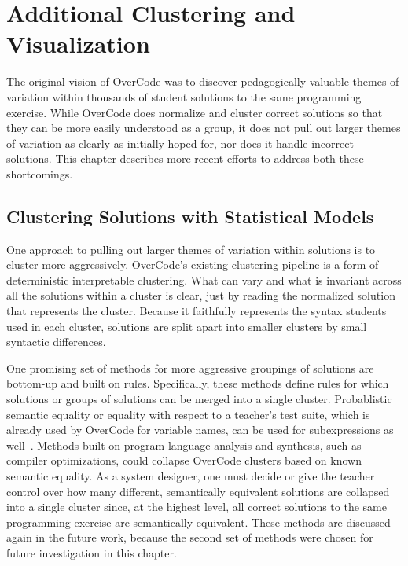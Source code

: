 \chapter{Additional Clustering and Visualization}\label{chapter:grovercode}

The original vision of OverCode was to discover pedagogically valuable themes of variation within thousands of student solutions to the same programming exercise. While OverCode does normalize and cluster correct solutions so that they can be more easily understood as a group, it does not pull out larger themes of variation as clearly as initially hoped for, nor does it handle incorrect solutions. This chapter describes more recent efforts to address both these shortcomings.

\section{Clustering Solutions with Statistical Models}\label{sec:latent}

One approach to pulling out larger themes of variation within solutions is to cluster more aggressively. OverCode's existing clustering pipeline is a form of deterministic interpretable clustering. What can vary and what is invariant across all the solutions within a cluster is clear, just by reading the normalized solution that represents the cluster. Because it faithfully represents the syntax students used in each cluster, solutions are split apart into smaller clusters by small syntactic differences. 

One promising set of methods for more aggressive groupings of solutions are bottom-up and built on rules. Specifically, these methods define rules for which solutions or groups of solutions can be merged into a single cluster. Probablistic semantic equality or equality with respect to a teacher's test suite, which is already used by OverCode for variable names, can be used for subexpressions as well~\cite{}. Methods built on program language analysis and synthesis, such as compiler optimizations, could collapse OverCode clusters based on known semantic equality. As a system designer, one must decide or give the teacher control over how many different, semantically equivalent solutions are collapsed into a single cluster since, at the highest level, all correct solutions to the same programming exercise are semantically equivalent. These methods are discussed again in the future work, because the second set of methods were chosen for future investigation in this chapter.


